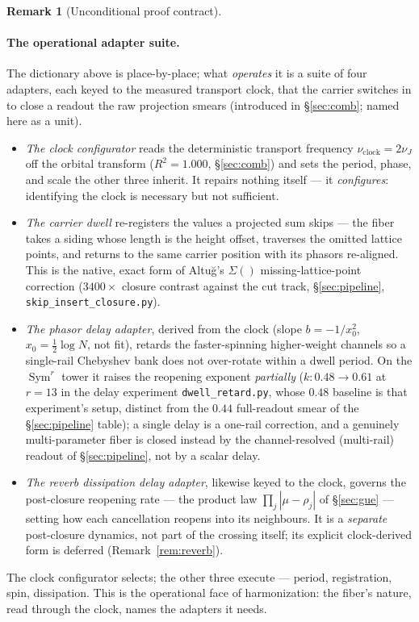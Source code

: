 \documentclass[11pt]{article}
\theoremstyle{definition}
\newtheorem{remark}[theorem]{Remark}
\newcommand{\Sym}{\operatorname{Sym}}
\begin{document}
\begin{remark}[Unconditional proof contract]
\begin{enumerate}
\paragraph{The operational adapter suite.} The dictionary above is place-by-place; what \emph{operates} it is a
suite of four adapters, each keyed to the measured transport clock, that the carrier switches in to close a
readout the raw projection smears (introduced in \S\ref{sec:comb}; named here as a unit).
\begin{itemize}
\item[\textup{(1)}] \emph{The clock configurator} reads the deterministic transport frequency
$\nu_{\mathrm{clock}}=2\nu_J$ off the orbital transform ($R^2=1.000$, \S\ref{sec:comb}) and sets the period,
phase, and scale the other three inherit. It repairs nothing itself --- it \emph{configures}: identifying the
clock is necessary but not sufficient.
\item[\textup{(2)}] \emph{The carrier dwell} re-registers the values a projected sum skips --- the fiber takes a
siding whose length is the height offset, traverses the omitted lattice points, and returns to the same carrier
position with its phasors re-aligned. This is the native, exact form of Altu\u{g}'s $\Sigma()$
missing-lattice-point correction ($3400\times$ closure contrast against the cut track, \S\ref{sec:pipeline},
\texttt{skip\_insert\_closure.py}).
\item[\textup{(3)}] \emph{The phasor delay adapter}, derived from the clock (slope $b=-1/x_0^2$, $x_0=\tfrac12
\log N$, not fit), retards the faster-spinning higher-weight channels so a single-rail Chebyshev bank does not
over-rotate within a dwell period. On the $\Sym^r$ tower it raises the reopening exponent \emph{partially}
($k\colon0.48\to0.61$ at $r=13$ in the delay experiment \texttt{dwell\_retard.py}, whose $0.48$ baseline is that
experiment's setup, distinct from the $0.44$ full-readout smear of the \S\ref{sec:pipeline} table); a single
delay is a one-rail correction, and a
genuinely multi-parameter fiber is closed instead by the channel-resolved (multi-rail) readout of
\S\ref{sec:pipeline}, not by a scalar delay.
\item[\textup{(4)}] \emph{The reverb dissipation delay adapter}, likewise keyed to the clock, governs the
post-closure reopening rate --- the product law $\prod_j|\mu-\rho_j|$ of \S\ref{sec:gue} --- setting how each
cancellation reopens into its neighbours. It is a \emph{separate} post-closure dynamics, not part of the crossing
itself; its explicit clock-derived form is deferred (Remark~\ref{rem:reverb}).
\end{itemize}
The clock configurator selects; the other three execute --- period, registration, spin, dissipation. This is the
operational face of harmonization: the fiber's nature, read through the clock, names the adapters it needs.


\end{enumerate}
\end{remark}
\end{document}
